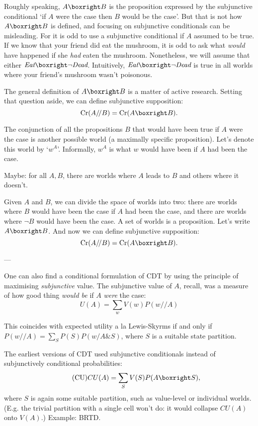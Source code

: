 {  Roughly speaking, $A \boxright B$ is the proposition expressed by
  the subjunctive conditional `if $A$ were the case then $B$ would be
  the case'. But that is not how $A \boxright B$ is defined, and
  focusing on subjunctive conditionals can be misleading. For it is
  odd to use a subjunctive conditional if $A$ assumed to be true. If
  we know that your friend did eat the mushroom, it is odd to ask what
  \emph{would} have happened if she \emph{had} eaten the
  mushroom. Nonetheless, we will assume that either $\emph{Eat}
  \boxright \neg \emph{Dead}$. Intuitively, $\emph{Eat} \boxright \neg
  \emph{Dead}$ is true in all worlds where your friend's mushroom
  wasn't poisonous.

  The general definition of $A \boxright B$ is a matter of active
  research.%
  Setting that question aside, we can define subjunctive supposition:
  \[
  \Cr(A/\!/B) = \Cr(A \boxright B).
  \]
  
  The conjunction of all the propositions $B$ that would have been true if $A$
  were the case is another possible world (a maximally specific proposition).
  Let's denote this world by `$w^A$'. Informally, $w^A$ is what $w$ would have
  been if $A$ had been the case.

  Maybe: for all $A,B$, there are worlds where $A$ leads to $B$ and others where
  it doesn't.

  Given $A$ and $B$, we can divide the space of worlds into two: there are
  worlds where $B$ would have been the case if $A$ had been the case, and there
  are worlds where $\neg B$ would have been the case. A set of worlds is a
  proposition. Let's write $A \boxright B$. And now we can define subjunctive
  supposition:
  \[
    \Cr(A/\!/B) = \Cr(A \boxright B).
  \]
  
  ---

  One can also find a conditional formulation of CDT by using the principle of
  maximising \emph{subjunctive} value. The subjunctive value of $A$, recall, was
  a measure of how good thing \emph{would be} if $A$ \emph{were} the case:
  \begin{equation}\tag{SV}
    U(A) = \sum_w V(w) P(w // A)
  \end{equation}
  
  This coincides with expected utility a la Lewis-Skyrms if and only if
  $P(w // A) = \sum_S P(S) P(w/ A\& S)$, where $S$ is a suitable state
  partition.
  
  The earliest versions of CDT used subjunctive conditionals instead
  of subjunctively conditional probabilities:
  \begin{equation}\tag{CU}
    CU(A) = \sum_S V(S) P(A \boxright S),
  \end{equation}
  where $S$ is again some suitable partition, such as value-level or
  individual worlds. (E.g. the trivial partition with a single cell
  won't do: it would collapse $CU(A)$ onto $V(A)$.) Example: BRTD.
} %

